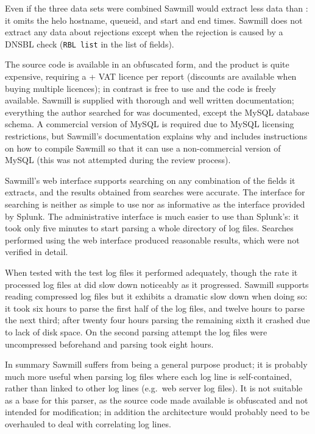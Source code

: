 Even if the three data sets were combined Sawmill would extract less data
than \parsername{}: it omits the helo hostname, queueid, and start and end
times.  Sawmill does not extract any data about rejections except when the
rejection is caused by a \gls{DNSBL} check (\texttt{RBL list} in the list
of fields).

The source code is available in an obfuscated form, and the product is
quite expensive, requiring a  + VAT licence per report
(discounts are available when buying multiple licences); in contrast
\parsername{} is free to use and the code is freely available.  Sawmill is
supplied with thorough and well written documentation; everything the
author searched for was documented, except the MySQL database schema.  A
commercial version of MySQL is required due to MySQL licensing
restrictions, but Sawmill's documentation explains why and includes
instructions on how to compile Sawmill so that it can use a non-commercial
version of MySQL (this was not attempted during the review process).

Sawmill's web interface supports searching on any combination of the fields
it extracts, and the results obtained from searches were accurate.  The
interface for searching is neither as simple to use nor as informative as
the interface provided by Splunk.  The administrative interface is much
easier to use than Splunk's: it took only five minutes to start parsing a
whole directory of log files.  Searches performed using the web interface
produced reasonable results, which were not verified in detail.

When tested with the \numberOFlogFILES{} test log files it performed
adequately, though the rate it processed log files at did slow down
noticeably as it progressed.  Sawmill supports reading compressed log files
but it exhibits a dramatic slow down when doing so: it took six hours to
parse the first half of the log files, and twelve hours to parse the next
third; after twenty four hours parsing the remaining sixth it crashed due
to lack of disk space.  On the second parsing attempt the log files were
uncompressed beforehand and parsing took eight hours.

In summary Sawmill suffers from being a general purpose product; it is
probably much more useful when parsing log files where each log line is
self-contained, rather than linked to other log lines (e.g.\ web server log
files).  It is not suitable as a base for this parser, as the source code
made available is obfuscated and not intended for modification; in addition
the architecture would probably need to be overhauled to deal with
correlating log lines.

